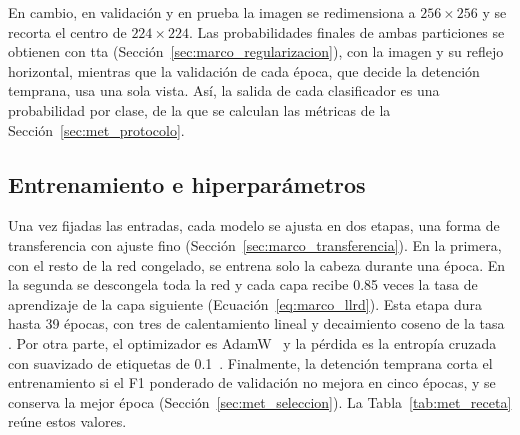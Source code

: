 En cambio, en validación y en prueba la imagen se redimensiona a $256 \times 256$ y se recorta el centro de
$224 \times 224$. Las probabilidades finales de ambas particiones se obtienen con \gls{tta}
(Sección~\ref{sec:marco_regularizacion}), con la imagen y su reflejo horizontal, mientras que la validación de cada
época, que decide la detención temprana, usa una sola vista. Así, la salida de cada clasificador es una probabilidad por
clase, de la que se calculan las métricas de la Sección~\ref{sec:met_protocolo}.

\subsection{Entrenamiento e hiperparámetros}
\label{sec:met_supervisados_receta}

Una vez fijadas las entradas, cada modelo se ajusta en dos etapas, una forma de transferencia con ajuste fino
(Sección~\ref{sec:marco_transferencia}).
En la primera, con el resto de la red congelado, se entrena solo la cabeza durante una época. En la segunda se
descongela toda la red y cada capa recibe 0.85 veces la tasa de aprendizaje de la capa siguiente
(Ecuación~\ref{eq:marco_llrd}). Esta etapa dura hasta 39 épocas, con tres de calentamiento lineal y decaimiento coseno de la tasa
\cite{goyal2017accurate,loshchilov2017sgdr}. Por otra parte, el optimizador es AdamW~\cite{loshchilov2019decoupled} y la
pérdida es la entropía cruzada con suavizado de etiquetas de 0.1~\cite{szegedy2016rethinking,muller2019does}.
Finalmente, la detención temprana corta el entrenamiento si el F1 ponderado de validación no mejora en cinco épocas, y se
conserva la mejor época (Sección~\ref{sec:met_seleccion}). La Tabla~\ref{tab:met_receta} reúne estos valores.

